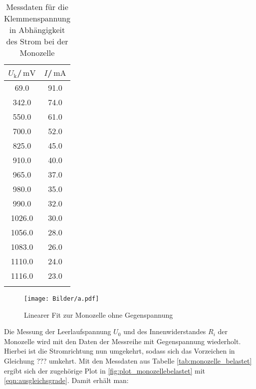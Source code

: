 \begin{table}
  \centering
  \caption{Messdaten für die Klemmenspannung in Abhängigkeit des Strom bei der Monozelle}
  \label{tab:mono}

\begin{tabular}{cc}
  \toprule
$U_\text{k}$/$\,\si{\milli\volt}$ & $I$/$\,\si{\milli\ampere}$\\
\midrule
69.0 & 91.0 \\
342.0 & 74.0 \\
550.0 & 61.0 \\
700.0 & 52.0 \\
825.0 & 45.0 \\
910.0 & 40.0 \\
965.0 & 37.0 \\
980.0 & 35.0 \\
990.0 & 32.0 \\
1026.0 & 30.0 \\
1056.0 & 28.0 \\
1083.0 & 26.0 \\
1110.0 & 24.0 \\
1116.0 & 23.0 \\
\bottomrule
\label{tab:labbadia}
\end{tabular}
\end{table}
\begin{figure}
\texttt{[image: Bilder/a.pdf]}
\caption{Linearer Fit zur Monozelle ohne Gegenspannung}
\label{fig:plot_a}
\end{figure}


Die Messung der Leerlaufspannung $U_\text{0}$ und des Innenwiderstandes $R_i$ der Monozelle wird mit den Daten der Messreihe mit Gegenspannung wiederholt. Hierbei ist die Stromrichtung nun umgekehrt, sodass sich das Vorzeichen in Gleichung ??? umkehrt.
Mit den Messdaten aus Tabelle \ref{tab:monozelle_belastet} ergibt sich der zugehörige Plot in \ref{fig:plot_monozellebelastet} mit \eqref{eqn:ausgleichsgrade}. Damit erhält man:

